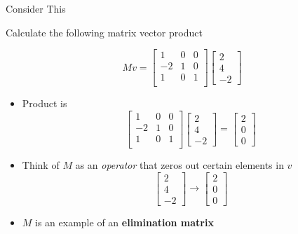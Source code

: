 \documentclass[10pt]{beamer}
\begin{document}
\begin{frame}[shrink]{Consider This}
    \begin{example}
        Calculate the following matrix vector product
            
            $$  Mv =     
            \begin{bmatrix}
          1 & 0 & 0\\
        -2 & 1 & 0\\
        1 & 0 & 1\\
        \end{bmatrix} \begin{bmatrix}2 \\ 4 \\ -2\end{bmatrix}$$ 
    \end{example}

\begin{itemize}
    \item Product is 
        \[
        \begin{bmatrix}
          1 & 0 & 0\\
        -2 & 1 & 0\\
        1 & 0 & 1\\
        \end{bmatrix}
        \begin{bmatrix}
        2 \\ 4 \\ -2
        \end{bmatrix}  =
        \begin{bmatrix}
        2 \\ 0 \\ 0
        \end{bmatrix}
        \]
    \item Think of $M$ as an \emph{operator} that zeros out certain elements in $v$
    $$
    \begin{bmatrix}2 \\ 4 \\ -2\end{bmatrix} \longrightarrow          \begin{bmatrix}
        2 \\ 0 \\ 0
        \end{bmatrix}
    $$
    \item $M$ is an example of an \textbf{elimination matrix}
\end{itemize}
\end{frame}
\end{document}

